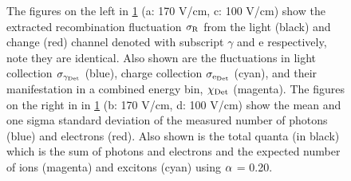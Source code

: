 \begin{figure}[h!]
\hfill
{}

\caption{The figures on the left in \ref{fig:R_Flucs_Quanta} (a: 170 V/cm, c: 100 V/cm) show the extracted recombination fluctuation $\rm \sigma_R$ from the light (black) and change (red) channel denoted with subscript $\gamma$ and e respectively, note they are identical. Also shown are the fluctuations in light collection $\rm \sigma_{\gamma_{Det}}$ (blue), charge collection $\rm \sigma_{e_{Det}}$ (cyan), and their manifestation in a combined energy bin, $\rm \chi_{Det}$ (magenta). The figures on the right in in \ref{fig:R_Flucs_Quanta} (b: 170 V/cm, d: 100 V/cm) show the mean and one sigma standard deviation of the measured number of photons (blue) and electrons (red). Also shown is the total quanta (in black) which is the sum of photons and electrons and the expected number of ions (magenta) and excitons (cyan) using $\rm \alpha$ = 0.20.}
\label{fig:R_Flucs_Quanta}
\end{figure}
\renewcommand{\baselinestretch}{2}
\small\normalsize

